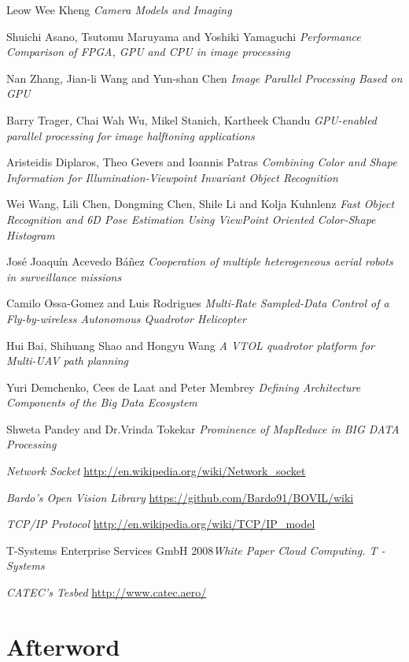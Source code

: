 \documentclass[11pt, oneside]{book} %
\begin{document}
\begin{thebibliography}{9}
  Leow Wee Kheng \textit{Camera Models and Imaging}

 Shuichi Asano, Tsutomu Maruyama and Yoshiki Yamaguchi \textit{Performance Comparison of FPGA, GPU and CPU in image processing}

 Nan Zhang, Jian-li Wang and Yun-shan Chen  \textit{Image Parallel Processing Based on GPU }

 Barry Trager, Chai Wah Wu, Mikel Stanich, Kartheek Chandu  \textit{GPU-enabled parallel processing for image halftoning applications}

  Aristeidis Diplaros, Theo Gevers and Ioannis Patras \textit{Combining Color and Shape Information for Illumination-Viewpoint Invariant Object Recognition}

 Wei Wang, Lili Chen, Dongming Chen, Shile Li and Kolja Kuhnlenz  \textit{Fast Object Recognition and 6D Pose Estimation Using ViewPoint Oriented Color-Shape Histogram}

 José Joaquín Acevedo B\'añez  \textit{Cooperation of multiple heterogeneous aerial robots in surveillance missions}

  Camilo Ossa-Gomez and Luis Rodrigues \textit{Multi-Rate Sampled-Data Control of a Fly-by-wireless Autonomous Quadrotor Helicopter}

 Hui Bai, Shihuang Shao and Hongyu Wang \textit{A VTOL quadrotor platform for Multi-UAV path planning}

 Yuri Demchenko, Cees de Laat and Peter Membrey \textit{Defining Architecture Components of the Big Data Ecosystem }

 Shweta Pandey  and Dr.Vrinda Tokekar \textit{Prominence of MapReduce in BIG DATA Processing}

\bibitem{}   \textit{}

 \textit{Network Socket} \url{http://en.wikipedia.org/wiki/Network_socket}

 \textit{Bardo's Open Vision Library} \url{https://github.com/Bardo91/BOVIL/wiki}

 \textit{TCP/IP Protocol}  \url{http://en.wikipedia.org/wiki/TCP/IP_model}

 T-Systems Enterprise Services GmbH 2008\textit{White Paper Cloud Computing. T - Systems} 

 \textit {CATEC's Tesbed} \url{http://www.catec.aero/}

\end{thebibliography}

\backmatter

\chapter{Afterword}
\end{document}
